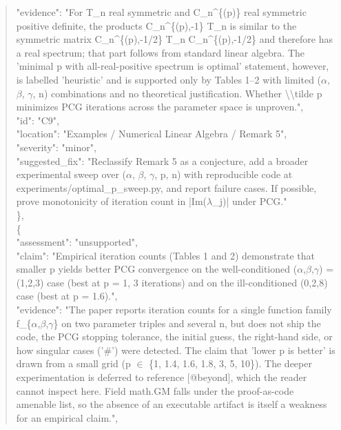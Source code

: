 \documentclass[11pt]{article}
\begin{document}
\begin{quote}
      "evidence": "For T\_n real symmetric and C\_n\^{}\{(p)\} real symmetric positive definite, the products C\_n\^{}\{(p),-1\} T\_n is similar to the symmetric matrix C\_n\^{}\{(p),-1/2\} T\_n C\_n\^{}\{(p),-1/2\} and therefore has a real spectrum; that part follows from standard linear algebra. The 'minimal p with all-real-positive spectrum is optimal' statement, however, is labelled 'heuristic' and is supported only by Tables 1--2 with limited (\ensuremath{\alpha}, \ensuremath{\beta}, \ensuremath{\gamma}, n) combinations and no theoretical justification. Whether \textbackslash{}\textbackslash{}tilde p minimizes PCG iterations across the parameter space is unproven.",\\
      "id": "C9",\\
      "location": "Examples / Numerical Linear Algebra / Remark 5",\\
      "severity": "minor",\\
      "suggested\_fix": "Reclassify Remark 5 as a conjecture, add a broader experimental sweep over (\ensuremath{\alpha}, \ensuremath{\beta}, \ensuremath{\gamma}, p, n) with reproducible code at experiments/optimal\_p\_sweep.py, and report failure cases. If possible, prove monotonicity of iteration count in |Im(\ensuremath{\lambda}\_j)| under PCG."\\
    \},\\
    \{\\
      "assessment": "unsupported",\\
      "claim": "Empirical iteration counts (Tables 1 and 2) demonstrate that smaller p yields better PCG convergence on the well-conditioned (\ensuremath{\alpha},\ensuremath{\beta},\ensuremath{\gamma}) = (1,2,3) case (best at p = 1, 3 iterations) and on the ill-conditioned (0,2,8) case (best at p = 1.6).",\\
      "evidence": "The paper reports iteration counts for a single function family f\_\{\ensuremath{\alpha},\ensuremath{\beta},\ensuremath{\gamma}\} on two parameter triples and several n, but does not ship the code, the PCG stopping tolerance, the initial guess, the right-hand side, or how singular cases ('\#') were detected. The claim that 'lower p is better' is drawn from a small grid (p \ensuremath{\in} \{1, 1.4, 1.6, 1.8, 3, 5, 10\}). The deeper experimentation is deferred to reference [@beyond], which the reader cannot inspect here. Field math.GM falls under the proof-as-code amenable list, so the absence of an executable artifact is itself a weakness for an empirical claim.",\\

\end{quote}
\end{document}
